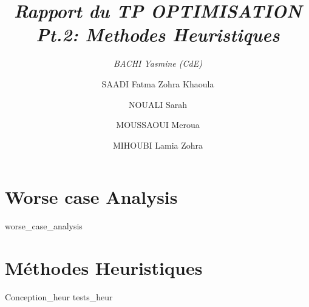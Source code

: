 \documentclass[12pt,a4paper, titlepage]{article}
\title{\emph{Rapport du TP OPTIMISATION Pt.2: Methodes Heuristiques} }
\author{ 
    \emph{BACHI Yasmine (CdE)}
    \and
    SAADI Fatma Zohra Khaoula
    \and 
    NOUALI Sarah
    \and 
    MOUSSAOUI Meroua
    \and 
    MIHOUBI Lamia Zohra}
\begin{document}
\maketitle
\tableofcontents
\part{Worse case Analysis}
{worse_case_analysis}
\newpage
\part{Méthodes Heuristiques}
{Conception_heur}
{tests_heur}
\end{document}
